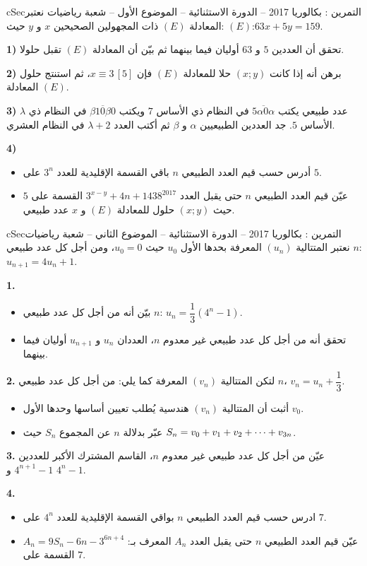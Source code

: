 \documentclass[12pt,a4paper]{article}
\newenvironment{BOX}[2]{\begin{otherlanguage}{english}\begin{arbox}{#1}{#2}}{\end{arbox}\end{otherlanguage}}
\newcounter{exo}
\newenvironment{tamrin}[1]{\stepcounter{exo}\begin{BOX}{cSec}{التمرين \theexo: #1}}{\end{BOX}}
\renewcommand{\cdots}{\mathinner{\cdotp\cdotp\cdotp}}
\newenvironment{sq}{\begin{itemize}[leftmargin=2.4em,itemsep=3pt]}{\end{itemize}}
\newcommand{\qa}{\item[(أ)]}\newcommand{\qb}{\item[(ب)]}\newcommand{\qc}{\item[(جـ)]}\newcommand{\qd}{\item[(د)]}\newcommand{\qe}{\item[(هـ)]}
\begin{document}
\begin{tamrin}{بكالوريا 2017 -- الدورة الاستثنائية -- الموضوع الأول -- شعبة رياضيات}
نعتبر المعادلة $(E)$ ذات المجهولين الصحيحين $x$ و $y$ حيث: $(E)$:\quad $63x+5y=159$.

\textbf{1)} تحقق أن العددين $5$ و $63$ أوليان فيما بينهما ثم بيّن أن المعادلة $(E)$ تقبل حلولا.

\textbf{2)} برهن أنه إذا كانت $(x;y)$ حلا للمعادلة $(E)$ فإن $x\equiv3\,[5]$، ثم استنتج حلول المعادلة $(E)$.

\textbf{3)} $\lambda$ عدد طبيعي يكتب $\overline{5\alpha0\alpha}$ في النظام ذي الأساس $7$ ويكتب $\overline{\beta10\beta0}$ في النظام ذي الأساس $5$.
جد العددين الطبيعيين $\alpha$ و $\beta$ ثم أكتب العدد $\lambda+2$ في النظام العشري.

\textbf{4)}
\begin{sq}
\qa أدرس حسب قيم العدد الطبيعي $n$ باقي القسمة الإقليدية للعدد $3^n$ على $5$.
\qb عيّن قيم العدد الطبيعي $n$ حتى يقبل العدد $3^{x-y}+4n+1438^{2017}$ القسمة على $5$ حيث $(x;y)$ حلول للمعادلة $(E)$ و $x$ عدد طبيعي.
\end{sq}
\end{tamrin}
\begin{tamrin}{بكالوريا 2017 -- الدورة الاستثنائية -- الموضوع الثاني -- شعبة رياضيات}
نعتبر المتتالية $(u_n)$ المعرفة بحدها الأول $u_0$ حيث $u_0=0$، ومن أجل كل عدد طبيعي $n$: $u_{n+1}=4u_n+1$.

\textbf{1.}
\begin{sq}
\qa بيّن أنه من أجل كل عدد طبيعي $n$: $u_n=\dfrac13\left(4^n-1\right)$.
\qb تحقق أنه من أجل كل عدد طبيعي غير معدوم $n$، العددان $u_n$ و $u_{n+1}$ أوليان فيما بينهما.
\end{sq}
\textbf{2.} لتكن المتتالية $(v_n)$ المعرفة كما يلي: من أجل كل عدد طبيعي $n$، $v_n=u_n+\dfrac13$.
\begin{sq}
\qa أثبت أن المتتالية $(v_n)$ هندسية يُطلب تعيين أساسها وحدها الأول $v_0$.
\qb عبّر بدلالة $n$ عن المجموع $S_n$ حيث $S_n=v_0+v_1+v_2+\cdots+v_{3n}$.
\end{sq}
\textbf{3.} عيّن من أجل كل عدد طبيعي غير معدوم $n$، القاسم المشترك الأكبر للعددين $4^{n+1}-1$ و $4^n-1$.

\textbf{4.}
\begin{sq}
\qa ادرس حسب قيم العدد الطبيعي $n$ بواقي القسمة الإقليدية للعدد $4^n$ على $7$.
\qb عيّن قيم العدد الطبيعي $n$ حتى يقبل العدد $A_n$ المعرف بـ: $A_n=9S_n-6n-3^{6n+4}$ القسمة على $7$.
\end{sq}
\end{tamrin}
\end{document}
